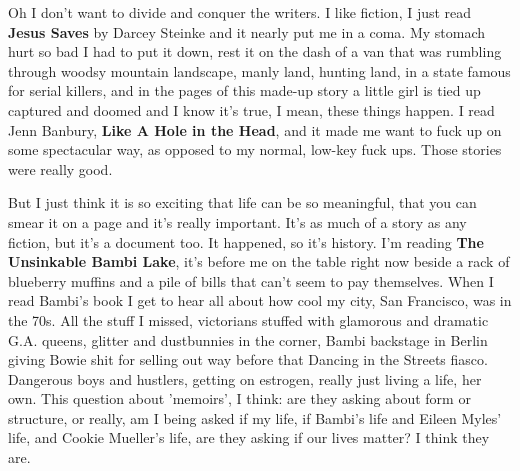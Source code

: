 Oh I don't want to divide and conquer the writers. I like fiction, I
just read \textbf{Jesus Saves} by Darcey Steinke and it nearly put me in
a coma. My stomach hurt so bad I had to put it down, rest it on the dash
of a van that was rumbling through woodsy mountain landscape, manly
land, hunting land, in a state famous for serial killers, and in the
pages of this made-up story a little girl is tied up captured and doomed
and I know it's true, I mean, these things happen. I read Jenn Banbury,
\textbf{Like A Hole in the Head}, and it made me want to fuck up on some
spectacular way, as opposed to my normal, low-key fuck ups. Those
stories were really good.

But I just think it is so exciting that life can be so meaningful, that
you can smear it on a page and it's really important. It's as much of a
story as any fiction, but it's a document too. It happened, so it's
history. I'm reading \textbf{The Unsinkable Bambi Lake}, it's before me
on the table right now beside a rack of blueberry muffins and a pile of
bills that can't seem to pay themselves. When I read Bambi's book I get
to hear all about how cool my city, San Francisco, was in the 70s. All
the stuff I missed, victorians stuffed with glamorous and dramatic G.A.
queens, glitter and dustbunnies in the corner, Bambi backstage in Berlin
giving Bowie shit for selling out way before that Dancing in the Streets
fiasco. Dangerous boys and hustlers, getting on estrogen, really just
living a life, her own. This question about 'memoirs', I think: are they
asking about form or structure, or really, am I being asked if my life,
if Bambi's life and Eileen Myles' life, and Cookie Mueller's life, are
they asking if our lives matter? I think they are.

